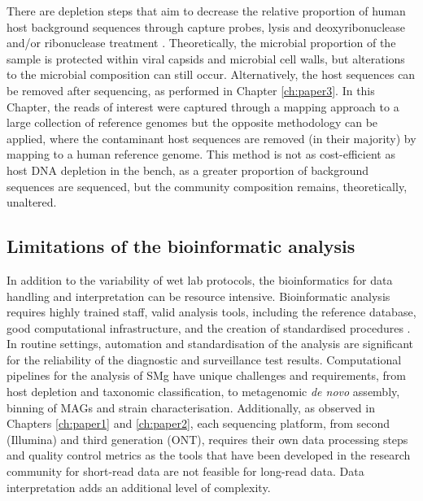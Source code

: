 There are depletion steps that aim to decrease the relative proportion of human host background sequences through capture probes, lysis and deoxyribonuclease and/or ribonuclease treatment \citep{gu_clinical_2019}. Theoretically, the microbial proportion of the sample is protected within viral capsids and microbial cell walls, but alterations to the microbial composition can still occur. Alternatively, the host sequences can be removed after sequencing, as performed in Chapter \ref{ch:paper3}. In this Chapter, the reads of interest were captured through a mapping approach to a large collection of reference genomes but the opposite methodology can be applied, where the contaminant host sequences are removed (in their majority) by mapping to a human reference genome. This method is not as cost-efficient as host DNA depletion in the bench, as a greater proportion of background sequences are sequenced, but the community composition remains, theoretically, unaltered. 

\subsection{Limitations of the bioinformatic analysis}

In addition to the variability of wet lab protocols, the bioinformatics for data handling and interpretation can be resource intensive. Bioinformatic analysis requires highly trained staff, valid analysis tools, including the reference database, good computational infrastructure, and the creation of standardised procedures \citep{petersen_third-generation_2019}. In routine settings, automation and standardisation of the analysis are significant for the reliability of the diagnostic and surveillance test results. Computational pipelines for the analysis of \ac{SMg} have unique challenges and requirements, from host depletion and taxonomic classification, to metagenomic \textit{de novo} assembly, binning of \ac{MAG}s and strain characterisation. Additionally, as observed in Chapters \ref{ch:paper1} and \ref{ch:paper2}, each sequencing platform, from second (Illumina) and third generation (\ac{ONT}), requires their own data processing steps and quality control metrics as the tools that have been developed in the research community for short-read data are not feasible for long-read data. Data interpretation adds an additional level of complexity.  

